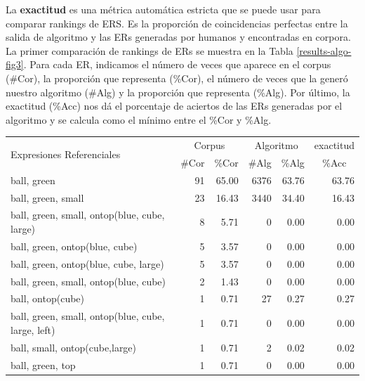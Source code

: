 \begin{table}[H]
La \textbf{exactitud}  es una m\'etrica autom\'atica estricta que se puede usar para comparar rankings de ERS. Es la proporci\'on de coincidencias perfectas entre la salida de algoritmo y las ERs generadas por humanos y encontradas en corpora. 
La primer comparaci\'on de rankings de ERs se muestra en la Tabla \ref{results-algo-fig3}. Para cada ER, indicamos el n\'umero de veces que aparece en el corpus (\#Cor), la proporci\'on que representa (\%Cor), el n\'umero de veces que la gener\'o nuestro algoritmo (\#Alg) y la proporci\'on que representa (\%Alg).
Por \'ultimo, la exactitud (\%Acc) nos d\'a el porcentaje de aciertos de las ERs generadas por el algoritmo y se calcula como el m\'inimo entre el \%Cor y \%Alg. 

\begin{table}[H]
\begin{small}
\begin{center}
\begin{tabular}{|l|r|r|r|r|r|}
\hline
\multirow{2}{*}{Expresiones Referenciales} & \multicolumn{2}{|c|}{Corpus} & \multicolumn{2}{|c|}{Algoritmo} & exactitud \\ \cline{2-6} 
 & \#Cor & \multicolumn{1}{|c|}{\%Cor} & \multicolumn{1}{|c|}{\#Alg} & \multicolumn{1}{|c|}{\%Alg} & \multicolumn{1}{|c|}{\%Acc} \\
\hline
ball, green                                    & 91 & 65.00 & 6376 & 63.76 & 63.76 \\
ball, green, small                              & 23 & 16.43 & 3440 & 34.40 & 16.43 \\
ball, green, small, ontop(blue, cube, large)      &  8 &  5.71 &    0 &  0.00 &  0.00\\
ball, green, ontop(blue, cube)                  &  5 &  3.57 &    0 &  0.00 &  0.00\\
ball, green, ontop(blue, cube, large)            &  5 &  3.57 &    0 &  0.00 &  0.00\\
ball, green, small, ontop(blue, cube)            &  2 &  1.43 &    0 &  0.00 &  0.00\\
ball, ontop(cube)                             &  1 &  0.71 &   27 &  0.27 &  0.27 \\
ball, green, small, ontop(blue, cube, large, left) &  1 &  0.71 &    0 &  0.00 &  0.00\\
ball, small, ontop(cube,large)	              &  1 &  0.71 &    2 &  0.02 &  0.02 \\
ball, green, top                                &  1 &  0.71 &    0 &  0.00 &  0.00\\

\end{tabular}
\end{center}
\end{small}
\end{table}
\end{table}
